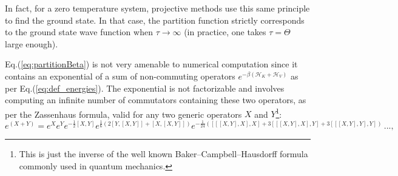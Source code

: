 %
%
In fact, for a zero temperature system, projective methods use this same principle to find the ground state.
In that case, the partition function strictly corresponds to the ground state wave function when $\tau \rightarrow \infty$ (in practice, one takes $\tau = \Theta$ large enough).
 
Eq.(\ref{eq:partitionBeta}) is not very amenable to numerical computation since it contains an exponential of a sum of non-commuting operators $e^{-\beta (\mathcal{H}_K + \mathcal{H}_V)}$ as per Eq.(\ref{eq:def_energies}). 
The exponential is not factorizable and involves computing an infinite number of commutators containing these two operators, as per the Zassenhaus formula, valid for any two generic operators $X$ and $Y$\footnote{This is just the inverse of the well known Baker–Campbell–Hausdorff formula commonly used in quantum mechanics.}:
\begin{equation}\label{eq:zassenhaus}
e^{(X+Y)}=e^{X} e^{Y} e^{-{\frac{1}{2}}[X,Y]} e^{{\frac {1}{6}}(2[Y,[X,Y]]+[X,[X,Y]])}  e^{{-\frac {1}{24}}([[[X,Y],X],X]+3[[[X,Y],X],Y]+3[[[X,Y],Y],Y])} \, ... , 
\end{equation}

